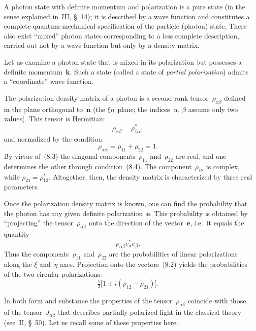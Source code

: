 A photon state with definite momentum and polarization is a pure state (in the sense explained in~III, \S~14); it is described by a wave function and constitutes a complete quantum-mechanical specification of the particle (photon) state. There also exist ``mixed'' photon states corresponding to a less complete description, carried out not by a wave function but only by a density matrix.

Let us examine a photon state that is mixed in its polarization but possesses a definite momentum~$\mathbf{k}$. Such a state (called a state of \emph{partial polarization}) admits a ``coordinate'' wave function.

The polarization density matrix of a photon is a second-rank tensor~$\rho_{\alpha\beta}$ defined in the plane orthogonal to~$\mathbf{n}$ (the $\xi\eta$~plane; the indices~$\alpha$, $\beta$ assume only two values). This tensor is Hermitian:
\begin{equation}
\rho_{\alpha\beta} = \rho_{\beta\alpha}^*,
\tag{8.3}
\end{equation}
and normalized by the condition
\begin{equation}
\rho_{\alpha\alpha} = \rho_{11} + \rho_{22} = 1.
\tag{8.4}
\end{equation}
By virtue of~(8.3) the diagonal components~$\rho_{11}$ and~$\rho_{22}$ are real, and one determines the other through condition~(8.4). The component~$\rho_{12}$ is complex, while $\rho_{21} = \rho_{12}^*$. Altogether, then, the density matrix is characterized by three real parameters.

Once the polarization density matrix is known, one can find the probability that the photon has any given definite polarization~$\mathbf{e}$. This probability is obtained by ``projecting'' the tensor~$\rho_{\alpha\beta}$ onto the direction of the vector~$\mathbf{e}$, i.e.\ it equals the quantity
\begin{equation}
\rho_{\alpha\beta}e_\alpha^*e_\beta.
\tag{8.5}
\end{equation}
Thus the components~$\rho_{11}$ and~$\rho_{22}$ are the probabilities of linear polarizations along the $\xi$ and~$\eta$ axes. Projection onto the vectors~(8.2) yields the probabilities of the two circular polarizations:
\begin{equation}
\tfrac{1}{2}\bigl[1 \pm i(\rho_{12} - \rho_{21})\bigr].
\tag{8.6}
\end{equation}

In both form and substance the properties of the tensor~$\rho_{\alpha\beta}$ coincide with those of the tensor~$J_{\alpha\beta}$ that describes partially polarized light in the classical theory (see~II, \S~50). Let us recall some of these properties here.

